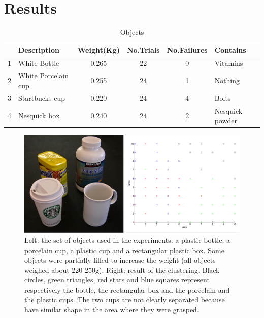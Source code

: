 \section{Results}
\label{sec:results}

\begin{table}[tb]
  \caption{Objects} \label{tab:objects} \centering
  \begin{tabular}{|c|l|c|c|c|l|}
    \hline
    &Description& Weight(Kg)&No.Trials&No.Failures&Contains \\
    \hline
    1&White Bottle        & 0.265 & 22& 0 & Vitamins\\
    2&White Porcelain cup & 0.255 & 24& 1 & Nothing\\
    3&Startbucks cup      & 0.220 & 24& 4 & Bolts \\
    4&Nesquick box        & 0.240 & 24& 2 & Nesquick powder\\

    \hline
  \end{tabular}
\end{table}

\begin{figure}[tbp]
\centerline{
\includegraphics[width=6.0in]{./figures/objects-clusters.eps}
}\caption{Left: the set of objects used in the experiments: a plastic bottle,
a porcelain cup, a plastic cup and a rectangular plastic box. Some objects were
partially filled to increase the weight (all objects weighed about 220-250g).
Right: result of the clustering. Black circles, green
triangles, red stars and blue squares represent respectively the bottle,
the rectangular box and the porcelain and the plastic cups. The two cups are not
clearly separated because have similar shape in the area where they were grasped.}
\label{fig:Objects}
\end{figure}


